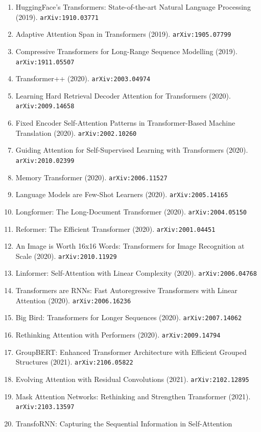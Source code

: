 \documentclass[11pt]{article}
\begin{document}
\begin{enumerate}
  \item HuggingFace's Transformers: State-of-the-art Natural Language Processing (2019). \texttt{arXiv:1910.03771}
  \item Adaptive Attention Span in Transformers (2019). \texttt{arXiv:1905.07799}
  \item Compressive Transformers for Long-Range Sequence Modelling (2019). \texttt{arXiv:1911.05507}
  \item Transformer++ (2020). \texttt{arXiv:2003.04974}
  \item Learning Hard Retrieval Decoder Attention for Transformers (2020). \texttt{arXiv:2009.14658}
  \item Fixed Encoder Self-Attention Patterns in Transformer-Based Machine
  Translation (2020). \texttt{arXiv:2002.10260}
  \item Guiding Attention for Self-Supervised Learning with Transformers (2020). \texttt{arXiv:2010.02399}
  \item Memory Transformer (2020). \texttt{arXiv:2006.11527}
  \item Language Models are Few-Shot Learners (2020). \texttt{arXiv:2005.14165}
  \item Longformer: The Long-Document Transformer (2020). \texttt{arXiv:2004.05150}
  \item Reformer: The Efficient Transformer (2020). \texttt{arXiv:2001.04451}
  \item An Image is Worth 16x16 Words: Transformers for Image Recognition at
  Scale (2020). \texttt{arXiv:2010.11929}
  \item Linformer: Self-Attention with Linear Complexity (2020). \texttt{arXiv:2006.04768}
  \item Transformers are RNNs: Fast Autoregressive Transformers with Linear
  Attention (2020). \texttt{arXiv:2006.16236}
  \item Big Bird: Transformers for Longer Sequences (2020). \texttt{arXiv:2007.14062}
  \item Rethinking Attention with Performers (2020). \texttt{arXiv:2009.14794}
  \item GroupBERT: Enhanced Transformer Architecture with Efficient Grouped
  Structures (2021). \texttt{arXiv:2106.05822}
  \item Evolving Attention with Residual Convolutions (2021). \texttt{arXiv:2102.12895}
  \item Mask Attention Networks: Rethinking and Strengthen Transformer (2021). \texttt{arXiv:2103.13597}
  \item TransfoRNN: Capturing the Sequential Information in Self-Attention

\end{enumerate}
\end{document}
